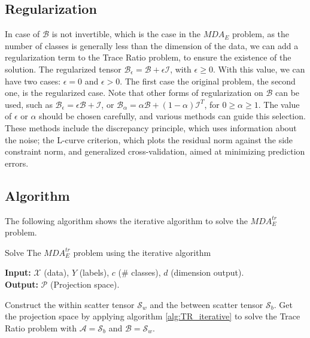 \documentclass{siamltex}
\begin{document}
\subsection{Regularization}
In case of $\mathcal{B}$ is not invertible, which is the case in the $MDA_E$ problem, as the number of classes is generally less than the dimension of the data, we can add a regularization term to the Trace Ratio problem, to ensure the existence of the solution. The regularized tensor $\mathcal{B}_\epsilon=\mathcal{B}+\epsilon \mathcal{I}$, with $\epsilon \geq 0$. With this value, we can have two cases: $\epsilon=0$ and $\epsilon >0$. The first case the original problem, the second one, is the regularized case.
Note that other forms of regularization on $\mathcal{B}$ can be used, such as $\mathcal{B}_\epsilon =\epsilon \mathcal{B}+ \mathcal{I}$, or $\mathcal{B}_\alpha =\alpha \mathcal{B}+ (1-\alpha) \mathcal{I}^T$, for $0 \geq \alpha \geq 1$. The value of $\epsilon$ or $\alpha$ should be chosen carefully, and various methods can guide this selection. These methods include the discrepancy principle, which uses information about the noise; the L-curve criterion, which plots the residual norm against the side constraint norm, and generalized cross-validation, aimed at minimizing prediction errors.
\subsection{Algorithm}
The following algorithm shows the iterative algorithm to solve the $MDA_E^{tr}$ problem.
\begin{algorithm}[H]
\caption{Solve The $MDA_E^{tr}$ problem using the iterative algorithm}
\label{algo:lda_e}
\hspace*{\algorithmicindent} \textbf{Input:} $\mathcal{X}$ (data), $Y$ (labels), $c$ ($\#$ classes), $d$ (dimension output).\\
\hspace*{\algorithmicindent} \textbf{Output:} $\mathcal{P}$ (Projection space).
\begin{algorithmic}[1]
\State Construct the within scatter tensor $\mathcal{S}_w$ and the between scatter tensor $\mathcal{S}_b$.
\State Get the projection space by applying algorithm \ref{alg:TR_iterative} to solve the Trace Ratio problem with $\mathcal{A}=\mathcal{S}_b$ and $\mathcal{B}=\mathcal{S}_w$.
\end{algorithmic}
\end{algorithm}
\end{document}
